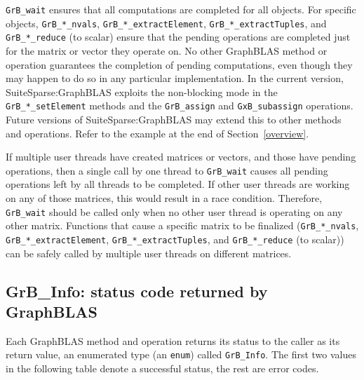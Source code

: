 \documentclass[12pt]{article}
\begin{document}
\verb'GrB_wait' ensures that all computations are completed for all objects.
For specific objects, \verb'GrB_*_nvals', \verb'GrB_*_extractElement',
\verb'GrB_*_extractTuples', and \verb'GrB_*_reduce' (to scalar) ensure that the
pending operations are completed just for the matrix or vector they operate on.
No other GraphBLAS method or operation guarantees the completion of pending
computations, even though they may happen to do so in any particular
implementation.  In the current version, SuiteSparse:GraphBLAS exploits the
non-blocking mode in the \verb'GrB_*_setElement' methods and the
\verb'GrB_assign' and \verb'GxB_subassign' operations.  Future versions of
SuiteSparse:GraphBLAS may extend this to other methods and operations.  Refer
to the example at the end of Section~\ref{overview}.

If multiple user threads have created matrices or vectors, and those have
pending operations, then a single call by one thread to \verb'GrB_wait' causes
all pending operations left by all threads to be completed.  If other user
threads are working on any of those matrices, this would result in a race
condition.  Therefore, \verb'GrB_wait' should be called only when no other user
thread is operating on any other matrix.  Functions that cause a specific
matrix to be finalized (\verb'GrB_*_nvals', \verb'GrB_*_extractElement',
\verb'GrB_*_extractTuples', and \verb'GrB_*_reduce' (to scalar)) can be safely
called by multiple user threads on different matrices.

\newpage
\subsection{{\sf GrB\_Info:} status code returned by GraphBLAS} %
\label{info}

Each GraphBLAS method and operation returns its status to the caller as its
return value, an enumerated type (an \verb'enum') called \verb'GrB_Info'.  The
first two values in the following table denote a successful status, the rest
are error codes.
\end{document}

